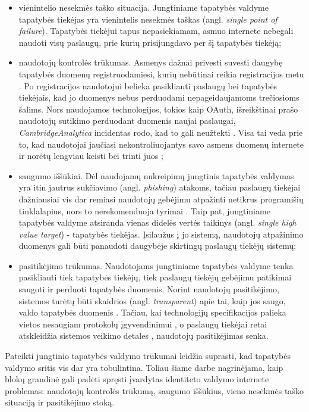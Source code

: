 \begin{itemize}
    \item vienintelio nesekmės taško situacija. Jungtiniame tapatybės valdyme tapatybės tiekėjas yra vienintelis nesekmės taškas (angl. \textit{single point of failure}).
    Tapatybės tiekėjui tapus nepasiekiamam, asmuo internete nebegali naudoti visų paslaugų, prie
    kurių prisijungdavo per šį tapatybės tiekėją;

    \item naudotojų kontrolės trūkumas. Asmenys dažnai privesti suvesti daugybę tapatybės duomenų registruodamiesi, kurių nebūtinai
    reikia registracijos metu \cite{Sun2011}. Po registracijos naudotojui belieka pasikliauti paslaugų bei tapatybės tiekėjais, kad jo duomenys nebus 
    perduodami nepageidaujamoms trečiosioms šalims. Nors naudojamos technologijos, tokios kaip OAuth, išreikštinai prašo naudotojų
    sutikimo perduodant duomenis naujai paslaugai, \textit{CambridgeAnalytica} incidentas rodo, kad to gali neužtekti \cite{CambridgeAnalytica}.
    Visa tai veda prie to, kad naudotojai jaučiasi nekontroliuojantys savo asmens duomenų internete ir norėtų lengviau keisti bei trinti juos \cite{Baars2016};

    \item saugumo iššūkiai. Dėl naudojamų nukreipimų jungtinis tapatybės valdymas yra itin jautrus sukčiavimo (angl. \textit{phishing}) atakoms,
    tačiau paslaugų tiekėjai dažniausiai vis dar remiasi naudotojų gebėjimu atpažinti netikrus programišių tinklalapius, nors to nerekomenduoja tyrimai \cite{Sun2011}.
    Taip pat, jungtiniame tapatybės valdyme atsiranda vienas didelės vertės taikinys (angl. \textit{single high value target}) - tapatybės tiekėjas. Įsilaužus į jo sistemą,
    naudotojų atpažinimo duomenys gali būti panaudoti daugybėje skirtingų paslaugų tiekėjų sistemų;

    \item pasitikėjimo trūkumas. Naudotojams jungtiniame tapatybės valdyme tenka pasikliauti tiek tapatybės tiekėjų,
    tiek paslaugų tiekėjų gebėjimu patikimai saugoti ir perduoti tapatybės duomenis. Norint naudotojų pasitikėjimo,
    sistemos turėtų būti skaidrios (angl. \textit{transparent}) apie tai, kaip jos saugo, valdo tapatybės duomenis \cite{Baars2016}.
    Tačiau, kai technologijų specifikacijos palieka vietos nesaugiam protokolų įgyvendinimui \cite{OAuthSecurity},
    o paslaugų tiekėjai retai atskleidžia sistemos veikimo detales \cite{Baars2016}, naudotojų pasitikėjimas senka.
\end{itemize}

Pateikti jungtinio tapatybės valdymo trūkumai leidžia suprasti, kad tapatybės valdymo sritis vis dar yra tobulintina. Toliau šiame darbe nagrinėjama,
kaip blokų grandinė gali padėti spręsti įvardytas identiteto valdymo internete problemas: naudotojų kontrolės trūkumą,
saugumo iššūkius, vieno nesėkmės taško situaciją ir pasitikėjimo stoką.